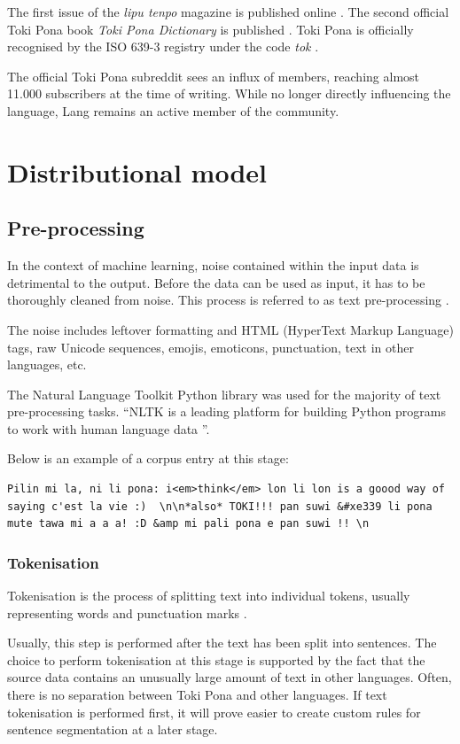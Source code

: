 \documentclass[14pt, a4paper]{extreport}
\begin{document}
The first issue of the \textit{lipu tenpo} magazine is published online \parencite{liputenpo}. The second official Toki Pona book \textit{Toki Pona Dictionary} is published \parencite{ku}. Toki Pona is officially recognised by the ISO 639-3 registry under the code \textit{tok} \parencite{isoproof}.

The official Toki Pona subreddit sees an influx of members, reaching almost 11.000 subscribers at the time of writing. While no longer directly influencing the language, Lang remains an active member of the community.

  \section{Distributional model}
    \subsection{Pre-processing}
In the context of machine learning, noise contained within the input data is detrimental to the output. Before the data can be used as input, it has to be thoroughly cleaned from noise. This process is referred to as text pre-processing \parencite[49]{vajjala}.

The noise includes leftover formatting and HTML (HyperText Markup Language) tags, raw Unicode sequences, emojis, emoticons, punctuation, text in other languages, etc.

The Natural Language Toolkit Python library was used for the majority of text pre-processing tasks. ``NLTK is a leading platform for building Python programs to work with human language data \parencite{nltk}''.

Below is an example of a corpus entry at this stage:

\begin{lstlisting}
Pilin mi la, ni li pona: i<em>think</em> lon li lon is a goood way of saying c'est la vie :)  \n\n*also* TOKI!!! pan suwi &#xe339 li pona mute tawa mi a a a! :D &amp mi pali pona e pan suwi !! \n
\end{lstlisting}
      \subsubsection{Tokenisation}
Tokenisation is the process of splitting text into individual tokens, usually representing words and punctuation marks \parencite[49]{vajjala}.

Usually, this step is performed after the text has been split into sentences. The choice to perform tokenisation at this stage is supported by the fact that the source data contains an unusually large amount of text in other languages. Often, there is no separation between Toki Pona and other languages. If text tokenisation is performed first, it will prove easier to create custom rules for sentence segmentation at a later stage.
\end{document}
